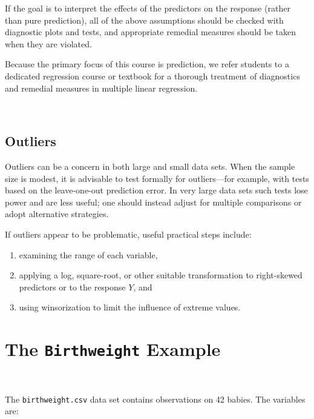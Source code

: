 \documentclass[
]{book}
\begin{document}
If the goal is to interpret the effects of the predictors on the response (rather than pure prediction), all of the above assumptions should be checked with diagnostic plots and tests, and appropriate remedial measures should be taken when they are violated.

Because the primary focus of this course is prediction, we refer students to a dedicated regression course or textbook for a thorough treatment of diagnostics and remedial measures in multiple linear regression.

~

\subsection*{Outliers}\label{outliers}

Outliers can be a concern in both large and small data sets. When the sample size is modest, it is advisable to test formally for outliers---for example, with tests based on the leave-one-out prediction error. In very large data sets such tests lose power and are less useful; one should instead adjust for multiple comparisons or adopt alternative strategies.

If outliers appear to be problematic, useful practical steps include:

\begin{enumerate}
\def\labelenumi{(\roman{enumi})}
\item
  examining the range of each variable,
\item
  applying a log, square-root, or other suitable transformation to right-skewed predictors or to the response \(Y\), and
\item
  using winsorization to limit the influence of extreme values.
\end{enumerate}

\section{\texorpdfstring{The \texttt{Birthweight} Example}{The Birthweight Example}}\label{the-birthweight-example}

~

The \texttt{birthweight.csv} data set contains observations on 42 babies. The variables are:
\end{document}
